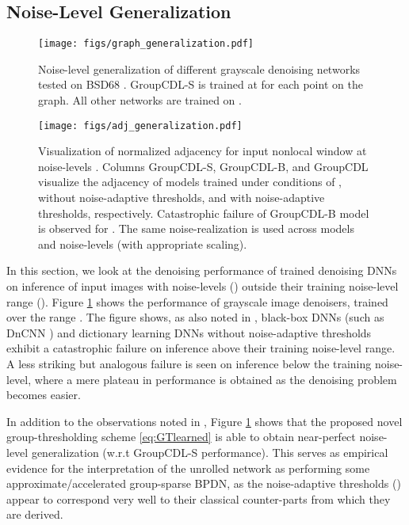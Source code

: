 \documentclass[lettersize,journal]{IEEEtran}
\begin{document}
\subsection{Noise-Level Generalization}
\begin{figure}
    \centering
    \texttt{[image: figs/graph\_generalization.pdf]}
    \caption{Noise-level generalization of different grayscale denoising
    networks tested on BSD68 \cite{bsd}. GroupCDL-S is trained at  
    for each point on the graph. All other networks are trained on .}
    \label{fig:generalization}
\end{figure}\begin{figure}[tbh]
    \centering
    \texttt{[image: figs/adj\_generalization.pdf]}
    \caption{
        Visualization of normalized adjacency  for input
        nonlocal window  at noise-levels . Columns
        GroupCDL-S, GroupCDL-B, and GroupCDL
        visualize the adjacency of models trained under conditions of
        ,  without noise-adaptive
        thresholds, and  with noise-adaptive
        thresholds, respectively. Catastrophic failure of GroupCDL-B model is
        observed for . The same noise-realization is used
        across models and noise-levels (with appropriate scaling). 
    }
    \label{fig:adj_gen}
\end{figure}In this section, we look at the denoising performance of trained denoising DNNs 
on inference of input images with noise-levels () outside their
training noise-level range (). Figure \ref{fig:generalization}
shows the performance of grayscale image denoisers, trained over the range
. The figure shows, as also noted in \cite{Mohan2020, janjusevicCDLNet2022,
janjusevicGDLNet2022}, black-box DNNs (such as DnCNN \cite{DnCNN}) and dictionary
learning DNNs without noise-adaptive thresholds exhibit a catastrophic failure
on inference above their training noise-level range. A less striking but
analogous failure is seen on inference below the training noise-level,
where a mere plateau in performance is obtained as the denoising problem becomes
easier. 

In addition to the observations noted in \cite{janjusevicCDLNet2022}, Figure
\ref{fig:generalization} shows that the proposed novel group-thresholding
scheme \eqref{eq:GTlearned} is able to obtain near-perfect noise-level
generalization (w.r.t GroupCDL-S performance). This serves as empirical evidence for
the interpretation of the unrolled network as performing some
approximate/accelerated group-sparse BPDN, as the noise-adaptive thresholds
() appear to correspond very well to
their classical counter-parts from which they are derived. 
\end{document}
